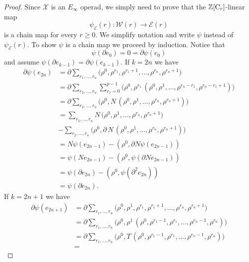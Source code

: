 \begin{proof}
	Since $\mathcal X$ is an $E_\infty$ operad, we simply need to prove that the $\mathbb{Z}[\mathrm{C}_r]$-linear map
	\begin{equation*}
	\psi_{\mathcal E}(r) \colon \mathcal W(r) \to \mathcal E(r)
	\end{equation*}
	is a chain map for every $r \geq 0$.
	We simplify notation and write $\psi$ instead of $\psi_{\mathcal E}(r)$. To show $\psi$ is a chain map we proceed by induction.
	Notice that
	\begin{equation*}
	\psi(\partial e_0) = 0 = \partial \psi(e_0)
	\end{equation*}
	and assume $\psi(\partial e_{k-1}) = \partial \psi(e_{k-1})$. If $k = 2n$ we have
	\begin{align*}
	\partial \psi(e_{2n}) & = 
	\partial \sum_{r_1, \dots, r_n} 
	\big(\rho^0, \rho^{r_1}, \rho^{r_1+1}, \dots, \rho^{r_n}, \rho^{r_n+1} \big)  \\ & =
	\partial \sum_{r_2, \dots, r_n} \sum_{r_1 = 0}^{p-1}
	\big(\rho^0, \rho^{r_1} \, (\rho^0, \rho^{1}, \dots, \rho^{r_n-r_1}, \rho^{r_n - r_1 +1}) \big) \\ & =
	\partial \sum_{r_2, \dots, r_n}
	\big(\rho^0, N\, (\rho^{0}, \rho^{1}, \dots, \rho^{r_n}, \rho^{r_n + 1}) \big) \\ & =
	\sum_{r_2, \dots, r_n}
	N\, \big( \rho^{0}, \rho^{1}, \dots, \rho^{r_n}, \rho^{r_n + 1} \big) \\ & -
	\sum_{r_2, \dots, r_n}
	\big(\rho^0, \partial \, N \, (\rho^{0}, \rho^{1}, \dots, \rho^{r_n}, \rho^{r_n+1}) \big) \\ & =
	N \psi(e_{2n-1}) - (\rho^0, \partial N \psi (e_{2n-1})) \\ & =
	\psi(N e_{2n-1}) - (\rho^0, \psi (\partial N e_{2n-1})) \\ & =
	\psi(\partial e_{2n}) - (\rho^0, \psi (\partial^2 e_{2n})) \\ & =
	\psi(\partial e_{2n}).
	\end{align*}
	If $k = 2n+1$ we have
	\begin{align*}
	\partial \psi(e_{2n+1}) & = 
	\partial \sum_{r_1, \dots, r_n} 
	\big(\rho^0, \rho^1, \rho^{r_1}, \rho^{r_1+1}, \dots, \rho^{r_n}, \rho^{r_n+1} \big)  \\ & =
	\partial \sum_{r_1, \dots, r_n}
	\big(\rho^0, \rho^{1} \, (\rho^0, \rho^{r_1-1}, \rho^{r_1}, \dots, \rho^{r_n - 1}, \rho^{r_n}) \big) \\ & =
	\partial \sum_{r_1, \dots, r_n}
	\big(\rho^0, T\, (\rho^0, \rho^{r_1-1}, \rho^{r_1}, \dots, \rho^{r_n - 1}, \rho^{r_n}) \big) \\ & =

\end{align*}
\end{proof}

